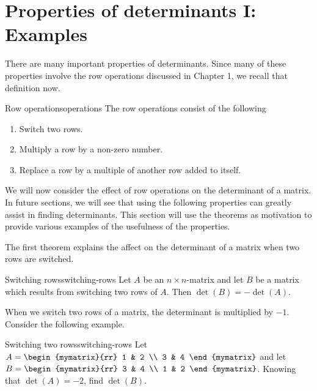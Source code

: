 \section{Properties of determinants I: Examples}

There are many important properties of determinants. Since many of these properties involve
the row operations discussed in Chapter 1, we recall that definition now. 

\begin{definition}{Row operations}{operations}
The row operations
consist of the following

\begin{enumerate}
\item Switch two rows.

\item Multiply a row by a non-zero number.

\item Replace a row by a multiple of another row added to itself.
\end{enumerate}
\end{definition}

We will now consider the effect of row operations on the determinant of a matrix. In future sections, we will see that using the following properties can 
greatly assist in finding determinants. This section will use the theorems as motivation to provide various examples of the usefulness of the properties. 

The first theorem explains the affect on the determinant of a matrix when two rows are switched. 

\begin{theorem}{Switching rows}{switching-rows}
Let $A$ be an $n\times n$-matrix and let $B$ be a matrix
which results from switching two rows of $A$. Then $\det (B)
= - \det (A)$. 
\end{theorem}

When we switch two rows of a matrix, the determinant is multiplied by $-1$. Consider the following example.

\begin{example}{Switching two rows}{switching-rows}
Let $A=\begin{mymatrix}{rr}
1 & 2 \\
3 & 4
\end{mymatrix} $ and let $B=\begin{mymatrix}{rr}
3 & 4 \\
1 & 2
\end{mymatrix}$. 
Knowing that $\det (A) =-2$, find $\det (B)$.
\end{example}

